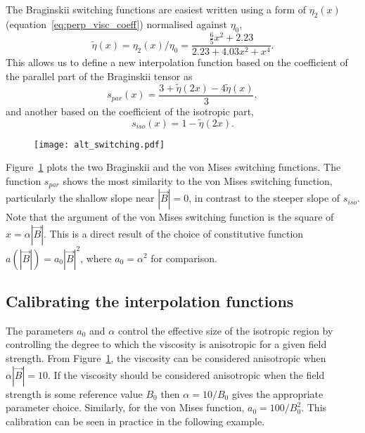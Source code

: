 The Braginskii switching functions are easiest written using a form of $\eta_2(x)$ (equation~\eqref{eq:perp_visc_coeff}) normalised against $\eta_0$,
\begin{equation}
  \label{eq:eta_function}
  \tilde{\eta}(x) = \eta_2(x)/\eta_0 = \frac{\tfrac{6}{5}x^2 + 2.23}{2.23 + 4.03 x^2 + x^4}.
\end{equation}
This allows us to define a new interpolation function based on the coefficient of the parallel part of the Braginskii tensor as
\begin{equation}
  \label{eq:alt_switching1}
s_{par}(x) = \frac{3+\tilde{\eta}(2x)-4\tilde{\eta}(x)}{3},
\end{equation}
and another based on the coefficient of the isotropic part,
\begin{equation}
  \label{eq:alt_switching2}
s_{iso}(x) = 1 - \tilde{\eta}(2x).
\end{equation}

\begin{figure}[t]
  \centering
  \texttt{[image: alt\_switching.pdf]}
  \label{fig:alt_switching}
\end{figure}

Figure~\ref{fig:alt_switching} plots the two Braginskii and the von Mises switching functions. The function $s_{par}$ shows the most similarity to the von Mises switching function, particularly the shallow slope near $|\vec{B}| = 0$, in contrast to the steeper slope of $s_{iso}$. Note that the argument of the von Mises switching function is the square of $x = \alpha |\vec{B}|$. This is a direct result of the choice of constitutive function $a(|\vec{B}|) = a_0 |\vec{B}|^2$, where $a_0 = \alpha^2$ for comparison.

\subsection{Calibrating the interpolation functions}

The parameters $a_0$ and $\alpha$ control the effective size of the isotropic region by controlling the degree to which the viscosity is anisotropic for a given field strength. From Figure~\ref{fig:alt_switching}, the viscosity can be considered anisotropic when $\alpha |\vec{B}| = 10$. If the viscosity should be considered anisotropic when the field strength is some reference value $B_0$ then $\alpha = 10/B_0$ gives the appropriate parameter choice. Similarly, for the von Mises function, $a_0 = 100/B_0^2$. This calibration  can be seen in practice in the following example.

